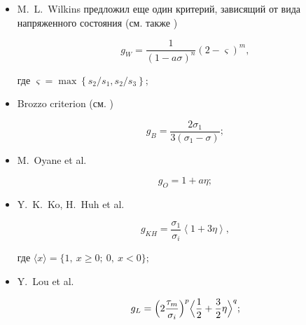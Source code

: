 \begin{itemize}
\item[--]

M.~L.~Wilkins \cite{keller:bib:Wilkins} предложил еще один критерий, зависящий от вида напряженного состояния (см. также \cite{keller:bib:triax1})

\begin{equation}

	g_{W}=\frac{1}{\left(1-a\sigma\right)^{n}}\left(2-\varsigma\right)^{m},

\end{equation}

где $\varsigma=\max\left\{{s_2}/{s_1},{s_2}/{s_3}\right\};$



\item[--]

Brozzo criterion (см. \cite{keller:bib:yang, keller:bib:takuda})

\begin{equation}

	g_{B}=\frac{2\sigma_1}{3(\sigma_1-\sigma)};

\end{equation}



\item[--]

M.~Oyane et al. \cite{keller:bib:oyane}

\begin{equation}

	g_{O}=1+a\eta;

\end{equation}



\item[--] 

Y.~K.~Ko, H.~Huh et al. \cite{keller:bib:ko}

\begin{equation}

	g_{KH}=\frac{\sigma_1}{\sigma_i}\left\langle 1+3\eta\right\rangle,

\end{equation}

где $\langle x\rangle=\{1,\ x\geq 0;\ 0,\ x<0\};$



\item[--] 

Y.~Lou et al. \cite{keller:bib:lou}

\begin{equation}

	g_{L}=\Bigl(2\frac{\tau_m}{\sigma_i}\Bigr)^p\Bigl\langle\frac{1}{2}+\frac{3}{2}\eta\Bigr\rangle^q;


\end{equation}
\end{itemize}
